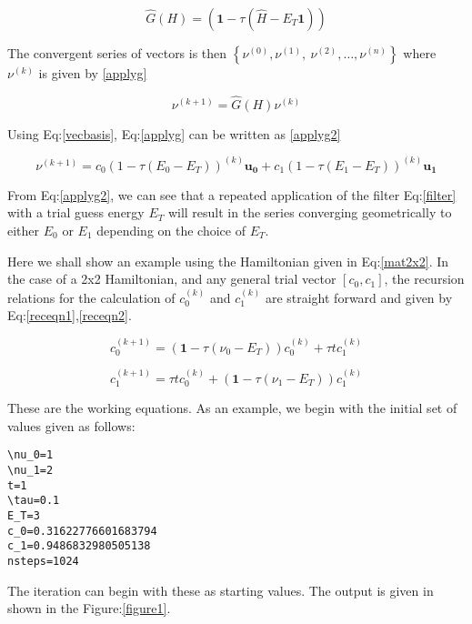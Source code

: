 \documentclass[11pt]{article}
\begin{document}
\begin{equation}
\label{filter}
\hat{G}(H) = \left ( \mathbf{1} - \tau (\hat{H} - E_T\mathbf{1}) \right)
\end{equation}

The convergent series of vectors is then \(\left\{ \nu^{(0)},  \nu^{(1)},\
\nu^{(2)},\dots,\nu^{(n)}\right\}\) where \(\nu^{(k)}\) is given by \ref{applyg}

\begin{equation}
\label{applyg}
\nu^{(k+1)} = \hat{G}(H)\nu^{(k)}
\end{equation}

Using Eq:\ref{vecbasis}, Eq:\ref{applyg} can be written as \ref{applyg2}

\begin{equation}
\label{applyg2}
\nu^{(k+1)} = c_0 (1-\tau(E_0-E_T))^{(k)}\mathbf{u_0} + c_1 (1-\tau(E_1-E_T))^{(k)}\mathbf{u_1}
\end{equation}

From Eq:\ref{applyg2}, we can see that a repeated application of the filter Eq:\ref{filter}
with a trial guess energy \(E_T\) will result in the series converging
geometrically to either \(E_0\) or \(E_1\) depending on the choice of \(E_T\).

Here we shall show an example using the Hamiltonian given in Eq:\ref{mat2x2}. In the
case of a 2x2 Hamiltonian, and any general trial vector \([c_0,c_1]\), the
recursion relations for the calculation of \(c^{(k)}_0\) and \(c^{(k)}_1\) are
straight forward and given by Eq:\ref{receqn1},\ref{receqn2}.

\begin{equation}
\label{receqn1}
c^{(k+1)}_0 =  \left(\mathbf{1}-\tau\left(\nu_0 - E_T\right)\right)c^{(k)}_0 + \tau t c^{(k)}_1
\end{equation}

\begin{equation}
\label{receqn2}
c^{(k+1)}_1 = \tau t c^{(k)}_0 + \left(\mathbf{1}-\tau\left(\nu_1 - E_T\right)\right)c^{(k)}_1
\end{equation}

These are the working equations. As an example, we begin with the initial set of
values given as follows:

\begin{verbatim}
\nu_0=1
\nu_1=2
t=1
\tau=0.1
E_T=3
c_0=0.31622776601683794
c_1=0.9486832980505138
nsteps=1024
\end{verbatim}

The iteration can begin with these as starting values. The output is given in
shown in the Figure:\ref{figure1}.
\end{document}

